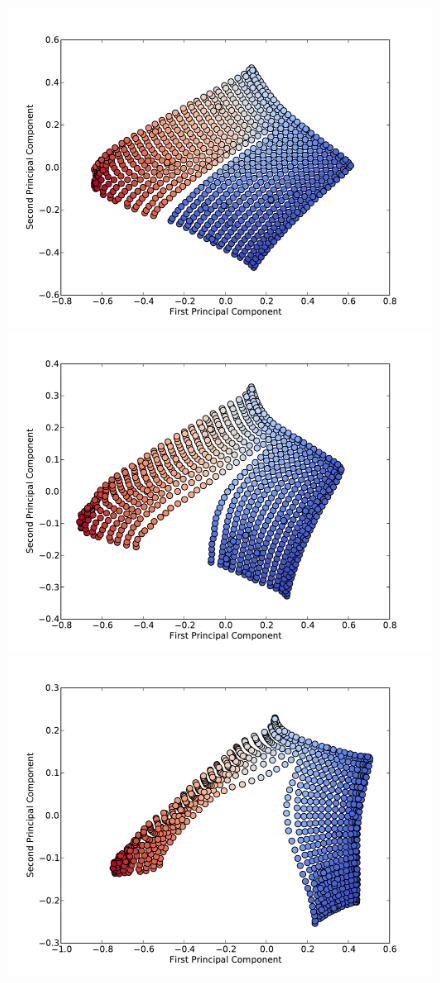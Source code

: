 \begin{figure}[!htb]
    \includegraphics[width=\linewidth]{figs/chap4/2rmop1.pdf}
  \endminipage\hfill
    \includegraphics[width=\linewidth]{figs/chap4/2rmop2.pdf}
  \endminipage
    \includegraphics[width=\linewidth]{figs/chap4/2rmop3.pdf}

\end{figure}
